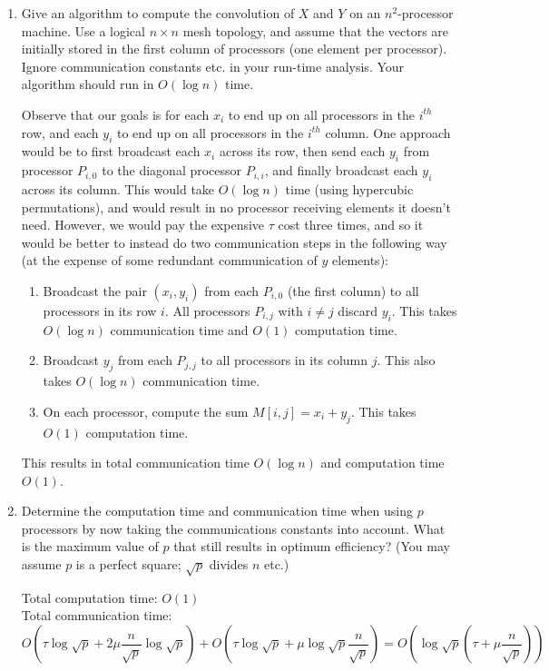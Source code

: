 \documentclass{article}
\begin{document}
\begin{enumerate}
  \item Give an algorithm to compute the convolution of $X$ and $Y$ on an $n^2$-processor machine.
  Use a logical $n \times n$ mesh topology, and assume that the vectors are initially stored in the first column of processors (one element per processor).
  Ignore communication constants etc. in your run-time analysis.
  Your algorithm should run in $O(\log{n})$ time.

  \quad Observe that our goals is for each $x_i$ to end up on all processors in the $i^{th}$ row, and each $y_i$ to end up on all processors in the $i^{th}$ column.
  One approach would be to first broadcast each $x_i$ across its row, then send each $y_i$ from processor $P_{i,0}$ to the diagonal processor $P_{i,i}$, and finally broadcast each $y_i$ across its column.
  This would take $O(\log{n})$ time (using hypercubic permutations), and would result in no processor receiving elements it doesn't need.
  However, we would pay the expensive $\tau$ cost three times, and so it would be better to instead do two communication steps in the following way (at the expense of some redundant communication of $y$ elements):
  \begin{enumerate}
    \item Broadcast the pair $(x_i, y_i)$ from each $P_{i,0}$ (the first column) to all processors in its row $i$.
    All processors $P_{i, j}$ with $i \neq j$ discard $y_i$.
    This takes $O(\log{n})$ communication time and $O(1)$ computation time.
    \item Broadcast $y_j$ from each $P_{j,j}$ to all processors in its column $j$.
    This also takes $O(\log{n})$ communication time.
    \item On each processor, compute the sum $M[i,j] = x_i + y_j$.
    This takes $O(1)$ computation time.
  \end{enumerate}

  This results in total communication time $O(\log{n})$ and computation time $O(1)$.

  \item Determine the computation time and communication time when using $p$ processors by now taking the communications constants into account.
  What is the maximum value of $p$ that still results in optimum efficiency?
  (You may assume $p$ is a perfect square; $\sqrt{p}$ divides $n$ etc.)

  Total computation time: $O(1)$\\
  Total communication time:
  $$O(\tau\log{\sqrt{p}} + 2\mu\frac{n}{\sqrt{p}} \log{\sqrt{p}}) + O(\tau\log{\sqrt{p}} + \mu\log{\sqrt{p}}\frac{n}{\sqrt{p}}) = O(\log{\sqrt{p}}\left(\tau + \mu\frac{n}{\sqrt{p}}\right))$$


\end{enumerate}
\end{document}

